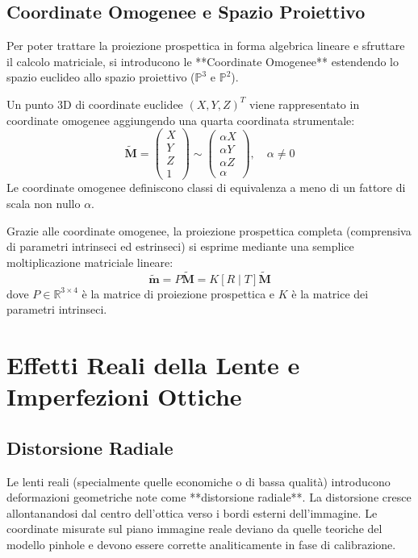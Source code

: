 \subsection{Coordinate Omogenee e Spazio Proiettivo}
Per poter trattare la proiezione prospettica in forma algebrica lineare e sfruttare il calcolo matriciale, si introducono le **Coordinate Omogenee** estendendo lo spazio euclideo allo spazio proiettivo ($\mathbb{P}^3$ e $\mathbb{P}^2$).

Un punto $3\text{D}$ di coordinate euclidee $(X, Y, Z)^T$ viene rappresentato in coordinate omogenee aggiungendo una quarta coordinata strumentale:
\begin{equation}
    \mathbf{\tilde{M}} = \begin{pmatrix} X \\ Y \\ Z \\ 1 \end{pmatrix} \sim \begin{pmatrix} \alpha X \\ \alpha Y \\ \alpha Z \\ \alpha \end{pmatrix}, \quad \alpha \neq 0
\end{equation}
Le coordinate omogenee definiscono classi di equivalenza a meno di un fattore di scala non nullo $\alpha$.

Grazie alle coordinate omogenee, la proiezione prospettica completa (comprensiva di parametri intrinseci ed estrinseci) si esprime mediante una semplice moltiplicazione matriciale lineare:
\begin{equation}
    \mathbf{\tilde{m}} = P \mathbf{\tilde{M}} = K [R \mid T] \mathbf{\tilde{M}}
\end{equation}
dove $P \in \mathbb{R}^{3 \times 4}$ è la matrice di proiezione prospettica e $K$ è la matrice dei parametri intrinseci.

\section{Effetti Reali della Lente e Imperfezioni Ottiche}

\subsection{Distorsione Radiale}
Le lenti reali (specialmente quelle economiche o di bassa qualità) introducono deformazioni geometriche note come **distorsione radiale**. La distorsione cresce allontanandosi dal centro dell'ottica verso i bordi esterni dell'immagine. Le coordinate misurate sul piano immagine reale deviano da quelle teoriche del modello pinhole e devono essere corrette analiticamente in fase di calibrazione.

